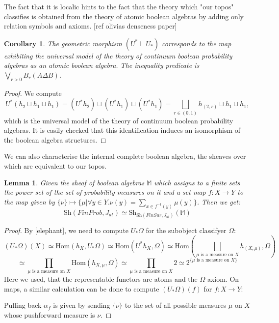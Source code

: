 \documentclass[a4paper]{amsproc}
\theoremstyle{plain}
\newtheorem{lemma}[theorem]{Lemma}
\newtheorem{corollary}[theorem]{Corollary}
\theoremstyle{definition}
\theoremstyle{remark}
\numberwithin{equation}{section}
\begin{document}
The fact that it is localic hints to the fact that the theory which "our topos" classifies is obtained from the theory of atomic boolean algebras by adding only relation symbols and axioms. [ref olivias denseness paper]
\begin{corollary} The geometric morphism $(U^*\vdash U_*)$ corresponds to the map exhibiting the universal model of the theory of continuum boolean probability algebras as an atomic boolean algebra. The inequality predicate is $\bigvee_{r>0} B_r ( A\Delta B )$.%
\end{corollary}
\begin{proof} We compute 
\[U^*(h_2\sqcup h_1 \sqcup h_1)= (U^*h_2)\sqcup (U^*h_1)\sqcup (U^*h_1)=\bigsqcup_{r\in (0,1)}h_{(2,r)}\sqcup h_1 \sqcup h_1, \] which is the universal model of the theory of continuum boolean probability algebras. It is easily checked that this identification induces an isomorphism of the boolean algebra structures.
\end{proof}%
We can also characterise the internal complete boolean algebra, the sheaves over which are equivalent to our topos.
\begin{lemma} Given the sheaf of boolean algebras $\mathbb{M}$ which assigns to a finite sets the power set of the set of probability measures on it and a set map $f:X\rightarrow Y$ to the map given by $\{\nu \}\mapsto \{\mu| \forall y\in Y. \nu(y)=\sum_{x\in f^{-1}(y)}\mu(y)  \}$. Then we get:
\[\text{Sh}(FinProb,J_{at})\simeq \text{Sh}_{\text{Sh}(FinSur,J_{at})}(\mathbb{M}) \]
\end{lemma}
\begin{proof} By [elephant], we need to compute $U_*\Omega$ for the subobject classifyer $\Omega$:
\[(U_*\Omega)(X)\simeq \text{Hom}(h_X,U_*\Omega)\simeq \text{Hom}(U^*h_X,\Omega)\simeq \text{Hom}(\bigsqcup_{\mu \text{ is a measure on }X}h_{(X,\mu)},\Omega)\]
\[\simeq \prod_{\mu \text{ is a measure on }X}\text{Hom}(h_{X,\mu},\Omega)\simeq \prod_{\mu \text{ is a measure on }X} 2\simeq 2^{\{\mu \text{ is a measure on }X\} } 
 \]
 Here we used, that the representable functors are atoms and the $\Omega$-axiom.
 On maps, a similar calculation can be done to compute $(U_*\Omega)(f)$ for $f:X\rightarrow Y$:
 \begin{center}
\end{center}
Pulling back $\alpha_f$ is given by sending $\{\nu\}$ to the set of all possible measures $\mu$ on $X$ whose pushforward measure is $\nu$.  
\end{proof} 
\end{document}
